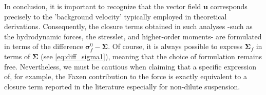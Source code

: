 In conclusion, it is important to recognize that the vector field \(\textbf{u}\) corresponds precisely to the 'background velocity' typically employed in theoretical derivations. 
Consequently, the closure terms obtained in such analyses -such as the hydrodynamic forces, the stresslet, and higher-order moments- are formulated in terms of the difference \(\bm\sigma_f^0 - \bm\Sigma\).
Of course, it is always possible to express \(\bm\Sigma_f\) in terms of \(\bm\Sigma\) (see \ref{eq:diff_sigma1}), meaning that the choice of formulation remains free. 
Nevertheless, we must be cautious when claiming that a specific expression of, for example, the Faxen contribution to the force is exactly equivalent to a closure term reported in the literature especially for non-dilute suspension. 

